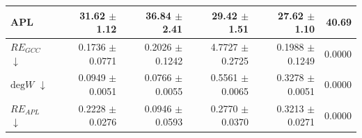 \begin{table}[H]
\begin{tabular}{lrrrrr}
APL                           & 31.62 $\pm$ 1.12 & 36.84 $\pm$ 2.41 & 29.42 $\pm$ 1.51 & 27.62 $\pm$ 1.10 & 40.69 \\
\midrule
$RE_{GCC}$ $\downarrow$       & 0.1736 $\pm$ 0.0771 & 0.2026 $\pm$ 0.1242 & 4.7727 $\pm$ 0.2725 & 0.1988 $\pm$ 0.1249 & 0.0000 \\
$\mathrm{deg}W$ $\downarrow$  & 0.0949 $\pm$ 0.0051 & 0.0766 $\pm$ 0.0055 & 0.5561 $\pm$ 0.0065 & 0.3278 $\pm$ 0.0051 & 0.0000 \\
$RE_{APL}$ $\downarrow$       & 0.2228 $\pm$ 0.0276 & 0.0946 $\pm$ 0.0593 & 0.2770 $\pm$ 0.0370 & 0.3213 $\pm$ 0.0271 & 0.0000 \\
\bottomrule
\end{tabular}
\end{table}
